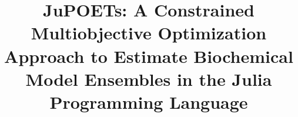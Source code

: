 \documentclass{bmcart}
\begin{document}
\begin{frontmatter}

\begin{fmbox}


\title{JuPOETs: A Constrained Multiobjective Optimization Approach to Estimate Biochemical Model Ensembles in the Julia Programming Language}


\author[
   addressref={aff2},
   email={dmb457@cornell.edu}
]{ }
\author[
   addressref={aff2},
   email={jtb47@cornell.edu}
]{ }
\author[
   addressref={aff1},                   %
   corref={aff1},                       %
   email={jdv27@cornell.edu}   %
]{ }


\address[id=aff1]{%
  , %
  ,                     %
  ,                             %
}
\address[id=aff2]{%
  ,
  ,                     %
  ,                             %
}


\end{fmbox}
\end{frontmatter}
\end{document}
